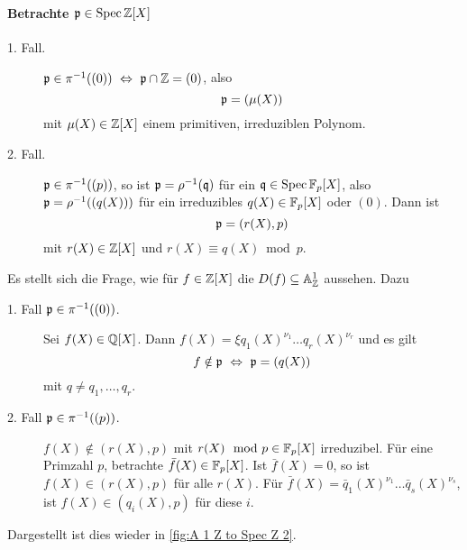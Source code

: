 \paragraph{Betrachte $\mathfrak{p}\in \operatorname{Spec}\mathbb{Z}[X]$}
\begin{description}
\item[1. Fall.]
	$\p\in \pi\inv((0))\ \Leftrightarrow\ \p\cap \Z = (0)$, also
	\[
		\mathfrak{p} = (\mu(X))
	\]
	mit $\mu(X) \in \mathbb{Z}[X]$ einem primitiven, irreduziblen Polynom.
\item[2. Fall.]
	$\mathfrak{p}\in\pi^{-1}((p))$, so ist $\mathfrak{p} = \rho^{-1}(\mathfrak{q})$ für ein 
	$\mathfrak{q}\in \operatorname{Spec}\mathbb F_p[X]$, also
	$\mathfrak{p} = \rho^{-1}((q(X)))$ für ein irreduzibles $q(X)\in \mathbb F_p[X]$
	oder $(0)$. Dann ist
	\[
		\mathfrak{p} = (r(X), p)
	\]
	mit $r(X) \in \mathbb{Z}[X]$ und $r(X) \equiv q(X) \bmod p$.
\end{description}
Es stellt sich die Frage, wie für $f\in \mathbb{Z}[X]$ die $D(f) \subseteq \mathbb{A}_\mathbb{Z}^1$
aussehen. Dazu
\begin{description}
\item[1. Fall $\mathfrak{p}\in \pi^{-1}((0))$.] Sei $f(X) \in \mathbb{Q}[X]$. Dann
	$f(X) = \xi q_1(X)^{\nu_1} \ldots q_r(X)^{\nu_r}$ und es gilt
	\[
		f\notin \p \ \Leftrightarrow\ \p = (q(X))
	\]
	mit $q \neq q_1, \ldots, q_r$.
\item[2. Fall $\mathfrak{p} \in \pi^{-1}((p))$.] $f(X) \notin (r(X), p)$
	mit $r(X) \mod p \in \mathbb F_p[X]$ irreduzibel. Für eine Primzahl $p$,
	betrachte $\bar f(X) \in \mathbb F_p[X]$.
	Ist $\bar f(X) = 0$, so ist $f(X) \in (r(X),p)$ für alle $r(X)$.
	Für $\bar f(X) = \bar q_1(X)^{\nu_1} \ldots \bar q_s(X)^{\nu_s}$, ist
	$f(X) \in (q_i(X), p)$ für diese $i$.
\end{description}
Dargestellt ist dies wieder in \autoref{fig:A 1 Z to Spec Z 2}.

